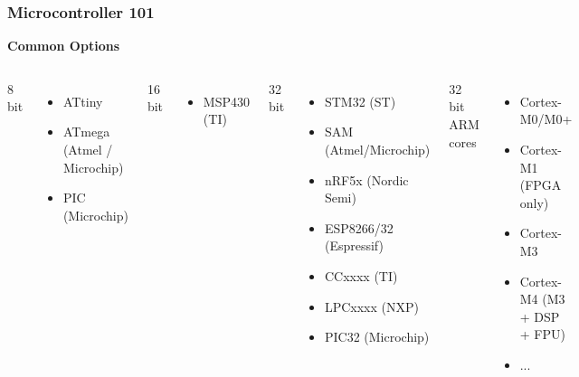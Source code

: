 \documentclass[t]{beamer}
\begin{document}
\begin{frame}[t]
\frametitle{Microcontroller 101}

\textbf{Common Options} 

\begin{columns}
	8 bit
	\begin{itemize}
		\item ATtiny
		\item ATmega \\(Atmel / \\Microchip)
		\item PIC \\(Microchip)
	\end{itemize}

	16 bit
	\begin{itemize}
		\item MSP430 (TI)
	\end{itemize}
	
	
	32 bit
	\begin{itemize}
		\item STM32 (ST)
		\item SAM (Atmel/Microchip)
		\item nRF5x (Nordic Semi)
		\item ESP8266/32 (Espressif)
		\item CCxxxx (TI)
		\item LPCxxxx (NXP)
		\item PIC32 (Microchip)
	\end{itemize}

	32 bit ARM cores
	\begin{itemize}
		\item Cortex-M0/M0+
		\item Cortex-M1 (FPGA only)
		\item Cortex-M3
		\item Cortex-M4 (M3 + DSP + FPU)
		\item ...
		
	\end{itemize}
	
\end{columns}

\end{frame}

\end{document}
